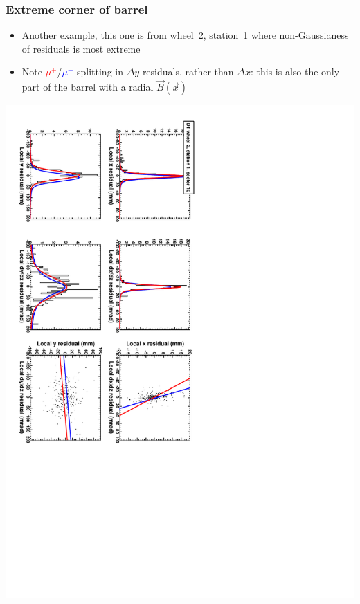 \documentclass[compress]{beamer}
\begin{document}
\begin{frame}
\frametitle{Extreme corner of barrel}

\begin{itemize}
\item Another example, this one is from wheel~2, station~1 where non-Gaussianess of residuals is most extreme
\item Note \textcolor{red}{$\mu^+$}/\textcolor{blue}{$\mu^-$}
  splitting in $\Delta y$ residuals, rather than $\Delta x$: this is
  also the only part of the barrel with a radial $\vec{B}(\vec{x})$
\end{itemize}

\vfill
\includegraphics[height=\linewidth, angle=90]{datafit_extreme_corner2.pdf}
\end{frame}
\end{document}
